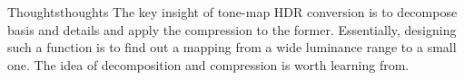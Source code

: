 \begin{problem}{Thoughts}{thoughts}
    The key insight of tone-map HDR conversion is to decompose basis and details and apply the compression to the former. Essentially, designing such a function is to find out a mapping from a wide luminance range to a small one. The idea of decomposition and compression is worth learning from.
\end{problem}





% 
% 

